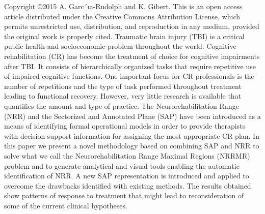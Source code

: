 \begin{flushleft}
Copyright \copyright 2015 A. Garc´ıa-Rudolph and K. Gibert. This is an open access article distributed under the Creative Commons
Attribution License, which permits unrestricted use, distribution, and reproduction in any medium, provided the original work is
properly cited.\newline 
Traumatic brain injury (TBI) is a critical public health and socioeconomic problem throughout the world. Cognitive rehabilitation
(CR) has become the treatment of choice for cognitive impairments after TBI. It consists of hierarchically organized tasks that
require repetitive use of impaired cognitive functions. One important focus for CR professionals is the number of repetitions and
the type of task performed throughout treatment leading to functional recovery. However, very little research is available that
quantifies the amount and type of practice. The Neurorehabilitation Range (NRR) and the Sectorized and Annotated Plane (SAP)
have been introduced as a means of identifying formal operational models in order to provide therapists with decision support
information for assigning the most appropriate CR plan. In this paper we present a novel methodology based on combining SAP
and NRR to solve what we call the Neurorehabilitation Range Maximal Regions (NRRMR) problem and to generate analytical
and visual tools enabling the automatic identification of NRR. A new SAP representation is introduced and applied to overcome
the drawbacks identified with existing methods. The results obtained show patterns of response to treatment that might lead to
reconsideration of some of the current clinical hypotheses.
\end{flushleft}





\newpage

